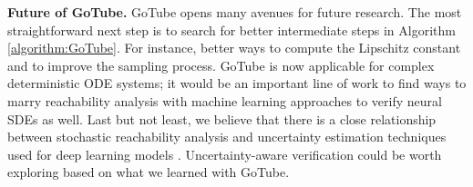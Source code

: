 \documentclass[letterpaper]{article} %
\begin{document}
\noindent\textbf{Future of GoTube.} GoTube opens many avenues for future research. The most straightforward next step is to search for better intermediate steps in Algorithm \ref{algorithm:GoTube}. For instance, better ways to compute the Lipschitz constant and to improve the sampling process. GoTube is now applicable for complex deterministic ODE systems; it would be an important line of work to find ways to marry reachability analysis with machine learning approaches to verify neural SDEs as well. 
Last but not least, we believe that there is a close relationship between stochastic reachability analysis and uncertainty estimation techniques used for deep learning models \cite{abdar2021review}. Uncertainty-aware verification could be worth exploring based on what we learned with GoTube. 




\clearpage
\setcounter{theorem}{0}


\end{document}
